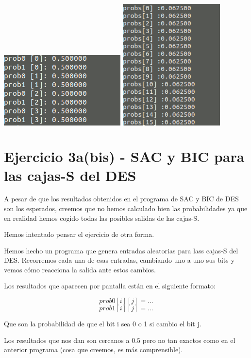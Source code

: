 \documentclass{apuntes}
\begin{document}
\begin{itemize}
	\begin{center}
		\includegraphics[width=180pt]{SACBICDES1.png}
		\includegraphics[width=150pt]{SACBICDES2.png}
	\end{center}
\end{itemize} 
\newpage
\appendix
\section{Ejercicio 3a(bis) - SAC y BIC para las cajas-S del DES}

A pesar de que los resultados obtenidos en el programa de SAC y BIC de DES son los esperados, creemos que no hemos calculado bien las probabilidades ya que en realidad hemos cogido todas las posibles salidas de las cajas-S.

Hemos intentado pensar el ejercicio de otra forma.

Hemos hecho un programa que genera entradas aleatorias para lass cajas-S del DES.
Recorremos cada una de esas entradas, cambiando uno a uno sus bits y vemos cómo reacciona la salida ante estos cambios.

Los resultados que aparecen por pantalla están en el siguiente formato:

$$prob0[i][j] = ...$$
$$prob1[i][j] = ...$$

Que son la probabilidad de que el bit i sea 0 o 1 si cambio el bit j.

Los resultados que nos dan son cercanos a $0.5$ pero no tan exactos como en el anterior programa (cosa que creemos, es más comprensible). 
\end{document}
